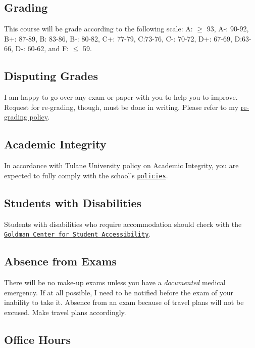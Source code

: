 \documentclass[letterpaper]{article}
\begin{document}
\subsection*{Grading}

This course will be grade according to the following scale: 
A: $\geq$ 93, A-: 90-92, B+: 87-89, B: 83-86, B-: 80-82, C+: 77-79, C:73-76, C-: 70-72, D+: 67-69, D:63-66, D-: 60-62, and F: $\leq$ 59. 

\subsection*{Disputing Grades}

I am happy to go over any exam or paper with you to help you to improve. Request for re-grading, though, must be done in writing. Please refer to my \href{https://github.com/hbahamonde/hbahamonde.github.io/raw/master/resources/ReGrade_Policy.pdf}{re-grading policy}.



\subsection*{Academic Integrity}
In accordance with Tulane University policy on Academic Integrity, you are expected to fully comply with the school's \href{http://tulane.edu/college/code.cfm}{\texttt{policies}}.


\subsection*{Students with Disabilities}
Students with disabilities who require accommodation should check with the \href{http://tulane.edu/studentaffairs/disability/index.cfm}{\texttt{Goldman Center for Student Accessibility}}.


\subsection*{Absence from Exams}


There will be no make-up exams unless you have a \emph{documented} medical emergency. If at all possible, I need to be notified before the exam of your inability to take it. Absence from an exam because of travel plans will not be excused. Make travel plans accordingly. 


\subsection*{Office Hours}
\end{document}

